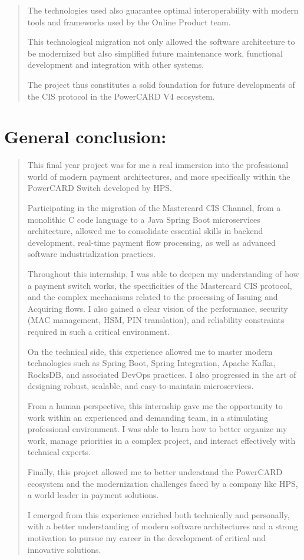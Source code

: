 \documentclass[12pt,a4paper]{report}
\begin{document}
\begin{quote}
The technologies used also guarantee optimal interoperability with
modern tools and frameworks used by the Online Product team.

This technological migration not only allowed the software architecture
to be modernized but also simplified future maintenance work, functional
development and integration with other systems.

The project thus constitutes a solid foundation for future developments
of the CIS protocol in the PowerCARD V4 ecosystem.
\end{quote}

\hypertarget{general-conclusion}{%
\section{\texorpdfstring{\textbf{General
conclusion:}}{General conclusion:}}\label{general-conclusion}}

\begin{quote}
This final year project was for me a real immersion into the
professional world of modern payment architectures, and more
specifically within the PowerCARD Switch developed by HPS.

Participating in the migration of the Mastercard CIS Channel, from a
monolithic C code language to a Java Spring Boot microservices
architecture, allowed me to consolidate essential skills in backend
development, real-time payment flow processing, as well as advanced
software industrialization practices.

Throughout this internship, I was able to deepen my understanding of how
a payment switch works, the specificities of the Mastercard CIS
protocol, and the complex mechanisms related to the processing of
Issuing and Acquiring flows. I also gained a clear vision of the
performance, security (MAC management, HSM, PIN translation), and
reliability constraints required in such a critical environment.

On the technical side, this experience allowed me to master modern
technologies such as Spring Boot, Spring Integration, Apache Kafka,
RocksDB, and associated DevOps practices. I also progressed in the art
of designing robust, scalable, and easy-to-maintain microservices.

From a human perspective, this internship gave me the opportunity to
work within an experienced and demanding team, in a stimulating
professional environment. I was able to learn how to better organize my
work, manage priorities in a complex project, and interact effectively
with technical experts.

Finally, this project allowed me to better understand the PowerCARD
ecosystem and the modernization challenges faced by a company like HPS,
a world leader in payment solutions.

I emerged from this experience enriched both technically and personally,
with a better understanding of modern software architectures and a
strong motivation to pursue my career in the development of critical and
innovative solutions.
\end{quote}
\end{document}
